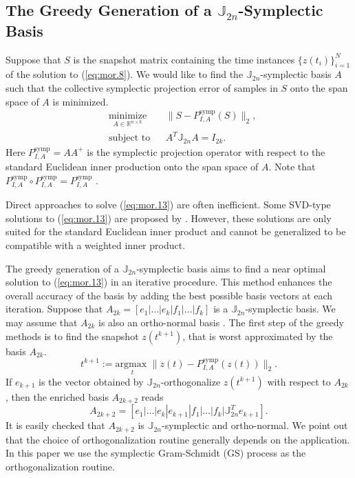 \subsection{The Greedy Generation of a $\mathbb J_{2n}$-Symplectic Basis} \label{sec:mor.3}
Suppose that $S$ is the snapshot matrix containing the time instances $\{z(t_i)\}_{i=1}^N$ of the solution to (\ref{eq:mor.8}). We would like to find the $\mathbb J_{2n}$-symplectic basis $A$ such that the collective symplectic projection error of samples in $S$ onto the span space of $A$ is minimized.
\begin{equation} \label{eq:mor.13}
\begin{aligned}
& \underset{A\in \mathbb{R}^{n\times k}}{\text{minimize}}
& & \| S - P^\text{symp}_{I,A}(S) \|_2, \\
& \text{subject to}
& & A^T\mathbb J_{2n}A = I_{2k}.
\end{aligned}
\end{equation}
Here $P^\text{symp}_{I,A} = AA^+$ is the symplectic projection operator with respect to the standard Euclidean inner production onto the span space of $A$. Note that $P^\text{symp}_{I,A} \circ P^\text{symp}_{I,A} = P^\text{symp}_{I,A}$ \cite{doi:10.1137/140978922,doi:10.1137/17M1111991}.

Direct approaches to solve (\ref{eq:mor.13}) are often inefficient. Some SVD-type solutions to (\ref{eq:mor.13}) are proposed by \cite{doi:10.1137/140978922}. However, these solutions are only suited for the standard Euclidean inner product and cannot be generalized to be compatible with a weighted inner product. 


The greedy generation of a $\mathbb J_{2n}$-symplectic basis aims to find a near optimal solution to (\ref{eq:mor.13}) in an iterative procedure. This method enhances the overall accuracy of the basis by adding the best possible basis vectors at each iteration. Suppose that $A_{2k} = [e_1|\dots|e_k|f_1|\dots|f_k]$ is a $\mathbb J_{2n}$-symplectic basis. We may assume that $A_{2k}$ is also an ortho-normal basis \cite{doi:10.1137/17M1111991}. The first step of the greedy methods is to find the snapshot $z(t^{k+1})$, that is worst approximated by the basis $A_{2k}$.
\begin{equation} \label{eq:mor.14}
	t^{k+1} := \underset{t}{\text{argmax } }\| z(t) - P^\text{symp}_{I,A}(z(t)) \|_2. 
\end{equation}
If $e_{k+1}$ is the vector obtained by $\mathbb J_{2n}$-orthogonalize $z(t^{k+1})$ with respect to $A_{2k}$ \cite{doi:10.1137/17M1111991}, then the enriched basis $A_{2k+2}$ reads
\begin{equation} \label{eq:mor.15}
	A_{2k+2} = [e_1|\dots|e_k|e_{k+1}|f_1|\dots|f_k|\mathbb{J}_{2n}^T e_{k+1}].	
\end{equation}
It is easily checked that $A_{2k+2}$ is $\mathbb J_{2n}$-symplectic and ortho-normal. We point out that the choice of orthogonalization routine generally depends on the application. In this paper we use the symplectic Gram-Schmidt (GS) process as the orthogonalization routine.

